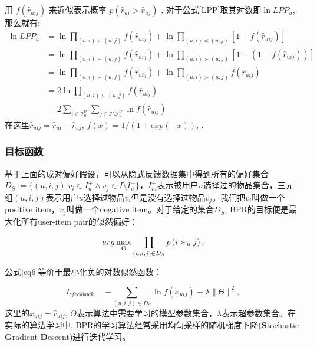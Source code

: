 用 $f \left(\hat{r}_{uij} \right)$ 来近似表示概率
$p\left(\hat{r}_{ui} > \hat{r}_{uj}\right)$ , 对于公式\ref{LPP}取其对数即$\ln LPP_u$, 那么就有:
\begin{equation}
\label{eq5}
\begin{aligned}
\ln LPP_u
&= \ln \prod_{\left(u,i\right) \succ \left(u,j\right)} f \left(\hat{r}_{uij}\right) + \ln \prod_{\left(u,i\right) \preceq \left(u,j\right)}\left[1- f \left(\hat{r}_{uij}\right)\right]\\
&= \ln \prod_{\left(u,i\right) \succ \left(u,j\right)} f \left(\hat{r}_{uij}\right) + \ln \prod_{\left(u,i\right) \succ \left(u,j\right)}\left[1-\left(1- f \left(\hat{r}_{uij}\right)\right)\right]\\
&= \ln \prod_{\left(u,i\right) \succ \left(u,j\right)} f \left(\hat{r}_{uij}\right) + \ln \prod_{\left(u,i\right) \succ \left(u,j\right)} f \left(\hat{r}_{uij}\right)\\
&= 2\ln \prod_{\left(u,i\right) \succ \left(u,j\right)} f \left(\hat{r}_{uij}\right)\\
&= 2 \sum_{i\in\mathcal{I}_u^{tr}}
\sum_{j \in \mathcal{I}\setminus \mathcal{I}_u^{tr}}\ln f \left(\hat{r}_{uij}\right)
\end{aligned}
\end{equation}
在这里$\hat{r}_{uij} = \hat{r}_{ui} - \hat{r}_{uj}$, $f \left(x\right) = 1/\left(1+exp\left(-x\right)\right)$, .

\subsubsection{目标函数}

基于上面的成对偏好假设，可以从隐式反馈数据集中得到所有的偏好集合$D_S := \{\left(u,i,j\right) | v_i \in I_{u}^+ \wedge v_j \in I \setminus I_{u}^+\}$，$I_m^+$表示被用户$u$选择过的物品集合，三元组$\left(u,i,j\right)$表示用户$u$选择过物品$v_i$但是没有选择过物品$v_j$。我们把$v_i$叫做一个positive item，$v_j$叫做一个negative item。对于给定的集合$D_S$, BPR的目标便是最大化所有user-item pair的似然偏好：

\begin{equation}
\label{eq6}
arg \max_{\substack \Theta } \prod_{\left(u,i,j\right) \in D_S} p\left(i \succ_u j\right),
\end{equation}

公式\eqref{eq6}等价于最小化负的对数似然函数：

\begin{equation}
\label{Lfeedback}
L_{feedback} = - \sum_{\left(u,i,j\right) \in D_S}\ln f \left( x_{uij}\right) + \lambda\|\Theta\|^2,
\end{equation}
这里的$x_{uij} = \hat{r}_{uij}$, $\Theta$表示算法中需要学习的模型参数集合，$\lambda$表示超参数集合。在实际的算法学习中, BPR的学习算法经常采用均匀采样的随机梯度下降(\textbf{S}tochastic \textbf{G}radient \textbf{D}escent)进行迭代学习。

